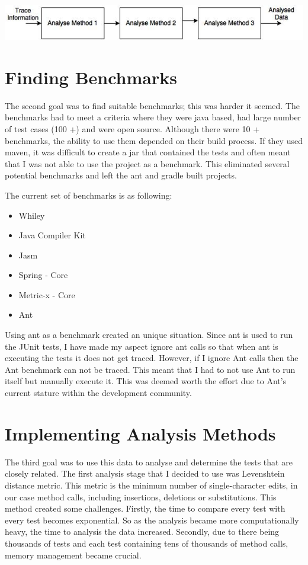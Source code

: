 \includegraphics[width=\textwidth]{Pipeline.jpg}

\section{Finding Benchmarks}

The second goal was to find suitable benchmarks; this was harder it seemed. The benchmarks had to meet a criteria where they were java based, had large number of test cases (100 +) and were open source. Although there were 10 + benchmarks, the ability to use them depended on their build process. If they used maven, it was difficult to create a jar that contained the tests and often meant that I was not able to use the project as a benchmark. This eliminated several potential benchmarks and left the ant and gradle built projects. 

The current set of benchmarks is as following:

\begin{itemize}
\item Whiley
\item Java Compiler Kit
\item Jasm
\item Spring - Core
\item Metric-x - Core
\item Ant
\end{itemize}


Using ant as a benchmark created an unique situation. Since ant is used to run the JUnit tests, I have made my aspect ignore ant calls so that when ant is executing the tests it does not get traced. However, if I ignore Ant calls then the Ant benchmark can not be traced. This meant that I had to not use Ant to run itself but manually execute it. This was deemed worth the effort due to Ant’s current stature within the development community. 

\section{Implementing Analysis Methods}

The third goal was to use this data to analyse and determine the tests that are closely related. The first analysis stage that I decided to use was Levenshtein distance metric. This metric is the minimum number of single-character edits, in our case method calls, including insertions, deletions or substitutions. This method created some challenges. Firstly, the time to compare every test with every test becomes exponential. So as the analysis became more computationally heavy, the time to analysis the data increased. Secondly, due to there being thousands of tests and each test containing tens of thousands of method calls, memory management became crucial. 

